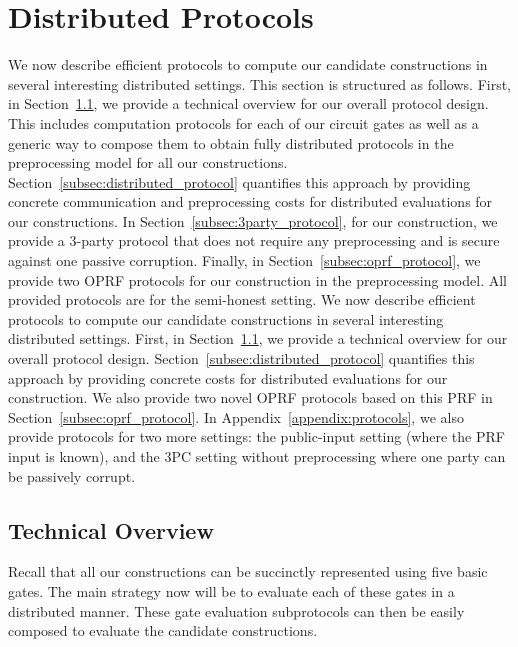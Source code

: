 \newpage
\section{Distributed Protocols}
\label{sec:distributed_protocols}
\iffull
We now describe efficient protocols to compute our candidate constructions in several interesting distributed settings. This section is structured as follows. First, in Section~\ref{subsec:protocol_overview}, we provide a technical overview for our overall protocol design. This includes computation protocols for each of our circuit gates as well as a generic way to compose them to obtain fully distributed protocols in the preprocessing model for all our constructions. Section~\ref{subsec:distributed_protocol} quantifies this approach by providing concrete communication and preprocessing costs for distributed evaluations for our constructions. In Section~\ref{subsec:3party_protocol}, for our \ttwPRF construction, we provide a 3-party protocol that does not require any preprocessing and is secure against one passive corruption. Finally, in Section~\ref{subsec:oprf_protocol}, we provide two OPRF protocols for our \ttwPRF construction in the preprocessing model. All provided protocols are for the semi-honest setting.
\else
We now describe efficient protocols to compute our candidate constructions in several interesting distributed settings. First, in Section~\ref{subsec:protocol_overview}, we provide a technical overview for our overall protocol design. Section~\ref{subsec:distributed_protocol} quantifies this approach by providing concrete costs for distributed evaluations for our \ttwPRF construction. We also provide two novel OPRF protocols based on this PRF in Section~\ref{subsec:oprf_protocol}. 
In Appendix~\ref{appendix:protocols}, we also provide protocols for two more settings: the public-input setting (where the PRF input is known), and the 3PC setting without preprocessing where one party can be passively corrupt.
\fi


\subsection{Technical Overview}
\label{subsec:protocol_overview}
Recall that all our constructions can be succinctly represented using five basic gates. The main strategy now will be to evaluate each of these gates in a distributed manner. These gate evaluation subprotocols can then be easily composed to evaluate the  candidate constructions. 

